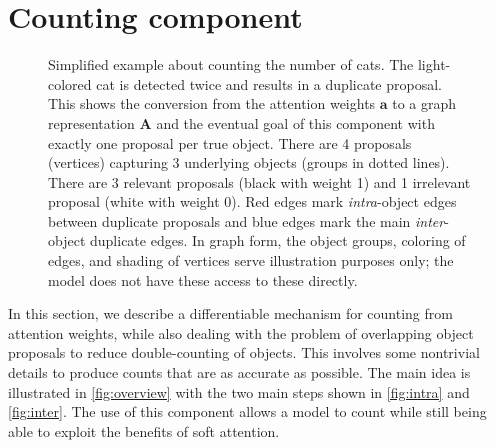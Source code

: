 \documentclass[letterpaper]{article}
\newcommand{\m}[1]{\mathbf{#1}}
\begin{document}
\newcommand{\AO}{\tilde{\m A}}
\newcommand{\T}{\mathsf{T}}

\section{Counting component}\label{sec:counting}

\begin{figure}
    \centering
    \caption{
        Simplified example about counting the number of cats.
        The light-colored cat is detected twice and results in a duplicate proposal.
        This shows the conversion from the attention weights $\m a$ to a graph representation $\m A$ and the eventual goal of this component with exactly one proposal per true object.
        There are 4 proposals (vertices) capturing 3 underlying objects (groups in dotted lines).
        There are 3 relevant proposals (black with weight 1) and 1 irrelevant proposal (white with weight 0).
        Red edges mark \emph{intra}-object edges between duplicate proposals and blue edges mark the main \emph{inter}-object duplicate edges.
        In graph form, the object groups, coloring of edges, and shading of vertices serve illustration purposes only; the model does not have these access to these directly.
    }
    \label{fig:overview}
\end{figure}

In this section, we describe a differentiable mechanism for counting from attention weights, while also dealing with the problem of overlapping object proposals to reduce double-counting of objects.
This involves some nontrivial details to produce counts that are as accurate as possible.
The main idea is illustrated in \autoref{fig:overview} with the two main steps shown in \autoref{fig:intra} and \autoref{fig:inter}.
The use of this component allows a model to count while still being able to exploit the benefits of soft attention.
\end{document}
